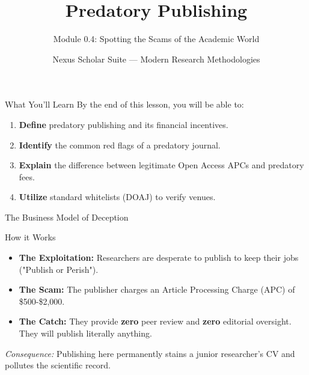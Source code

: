 \documentclass[aspectratio=169]{beamer}
\title{Predatory Publishing}
\subtitle{Module 0.4: Spotting the Scams of the Academic World}
\author{Nexus Scholar Suite --- Modern Research Methodologies}
\date{}
\begin{document}
\begin{frame}[plain]
  \titlepage
\end{frame}

\begin{frame}{What You'll Learn}
  By the end of this lesson, you will be able to:
  \begin{enumerate}
    \item \textbf{Define} predatory publishing and its financial incentives.
    \item \textbf{Identify} the common red flags of a predatory journal.
    \item \textbf{Explain} the difference between legitimate Open Access APCs and predatory fees.
    \item \textbf{Utilize} standard whitelists (DOAJ) to verify venues.
  \end{enumerate}
\end{frame}

\begin{frame}{The Business Model of Deception}
  \begin{alertblock}{How it Works}
    \begin{itemize}
      \item \textbf{The Exploitation:} Researchers are desperate to publish to keep their jobs ("Publish or Perish").
      \item \textbf{The Scam:} The publisher charges an Article Processing Charge (APC) of \$500-\$2,000.
      \item \textbf{The Catch:} They provide \textbf{zero} peer review and \textbf{zero} editorial oversight. They will publish literally anything.
    \end{itemize}
  \end{alertblock}
  \vspace{0.3cm}
  \textit{Consequence:} Publishing here permanently stains a junior researcher's CV and pollutes the scientific record.
\end{frame}
\end{document}
